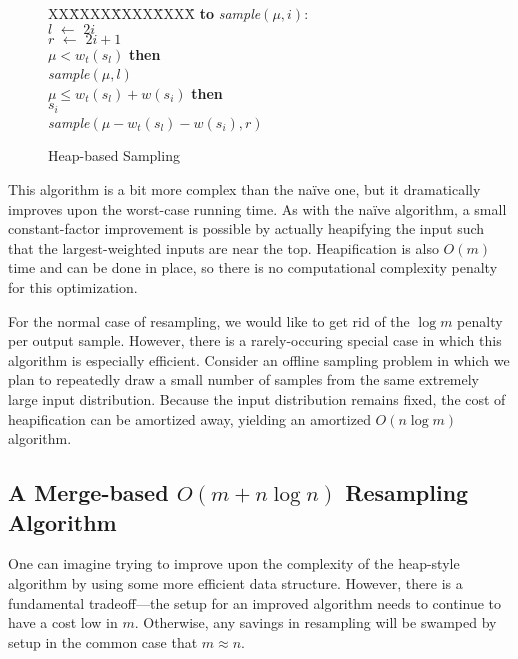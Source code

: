 \documentclass[12pt]{article}
\newcommand{\asgn}{\,\,\leftarrow\,\,}
\begin{document}
  \begin{figure}
    \centering
    \begin{minipage}{0.6\textwidth}
      \begin{tabbing}
      XX\=XXXX\=XXXX\=XXXX\=\kill
      {\bf to} {\it sample}$(\mu,i)$: \\
      \>$l \asgn 2i$ \\
      \>$r \asgn 2i + 1$ \\
       $\mu < w_t(s_l)$ {\bf then} \\
      \> {\it sample}$(\mu, l)$ \\
       $\mu \le w_t(s_l) + w(s_i)$ {\bf then} \\
      \> $s_i$ \\
       {\it sample}$(\mu - w_t(s_l) - w(s_i), r)$
    \end{tabbing}
    \end{minipage}
    \caption{Heap-based Sampling}\label{fig-onlm}
  \end{figure}

  This algorithm is a bit more complex than the na\"ive one,
  but it dramatically improves upon the worst-case running
  time.  As with the na\"ive algorithm, a small
  constant-factor improvement is possible by actually
  heapifying the input such that the largest-weighted inputs
  are near the top.  Heapification is also $O(m)$ time and
  can be done in place, so there is no computational
  complexity penalty for this optimization.

  For the normal case of resampling, we would like to get
  rid of the $\log m$ penalty per output sample.  However,
  there is a rarely-occuring special case in which this
  algorithm is especially efficient.  Consider an offline
  sampling problem in which we plan to repeatedly draw a
  small number of samples from the same extremely large
  input distribution.  Because the input distribution
  remains fixed, the cost of heapification can be amortized
  away, yielding an amortized $O(n \log m)$ algorithm.

\subsection{A Merge-based $O(m + n \log n)$ Resampling Algorithm}\label{sec-merge}

  One can imagine trying to improve upon the complexity of
  the heap-style algorithm by using some more efficient data
  structure.  However, there is a fundamental tradeoff---the
  setup for an improved algorithm needs to continue to have
  a cost low in $m$.  Otherwise, any savings in resampling
  will be swamped by setup in the common case that $m
  \approx n$.
\end{document}
